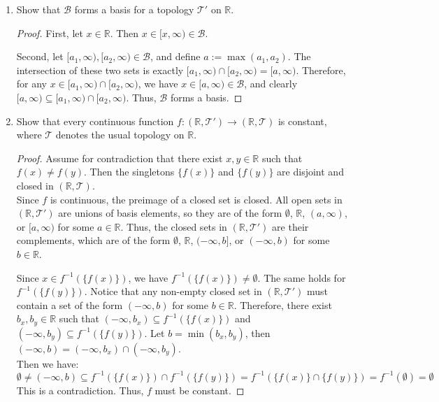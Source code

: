\documentclass[a4paper,11pt]{article}
\newcommand{\R}{\mathbb{R}}
\newcommand{\T}{\mathcal{T}}
\newcommand{\B}{\mathcal{B}}
\newcommand{\inv}[1]{#1^{-1}}
\begin{document}
\begin{enumerate}[label=\textbf{(\alph*)}]
    \item Show that $\B$ forms a basis for a topology $\T'$ on $\R$.
    \begin{proof}
        First, let $x \in \R$. Then $x \in [x,\infty) \in \B$.

        Second, let $[a_1,\infty), [a_2,\infty) \in \B$, and define $a := \max(a_1,a_2)$.
        The intersection of these two sets is exactly $[a_1,\infty) \cap [a_2,\infty) = [a,\infty)$.
        Therefore, for any $x \in [a_1,\infty) \cap [a_2,\infty)$, we have $x \in [a,\infty) \in \B$, and clearly $[a,\infty) \subseteq [a_1,\infty) \cap [a_2,\infty)$.
        Thus, $\B$ forms a basis.
    \end{proof}

\item Show that every continuous function $f\colon (\R, \T') \to (\R, \T)$ is constant, where $\T$ denotes the usual topology on $\R$.
\begin{proof}
        Assume for contradiction that there exist $x,y \in \R$ such that $f(x) \neq f(y)$.
        Then the singletons $\{f(x)\}$ and $\{f(y)\}$ are disjoint and closed in $(\R, \T)$. \\
        Since $f$ is continuous, the preimage of a closed set is closed. 
        All open sets in $(\R, \T')$ are unions of basis elements, so they are of the form $\emptyset$, $\R$, $(a,\infty)$, or $[a,\infty)$ for some $a \in \R$. 
        Thus, the closed sets in $(\R, \T')$ are their complements, which are of the form $\emptyset$, $\R$, $(-\infty,b]$, or $(-\infty,b)$ for some $b \in \R$.
        
        Since $x \in \inv{f}(\{f(x)\})$, we have $\inv{f}(\{f(x)\}) \neq \emptyset$. The same holds for $\inv{f}(\{f(y)\})$.
        Notice that any non-empty closed set in $(\R, \T')$ must contain a set of the form $(-\infty, b)$ for some $b \in \R$.
        Therefore, there exist $b_x, b_y \in \R$ such that $(-\infty, b_x) \subseteq \inv{f}(\{f(x)\})$ and $(-\infty, b_y) \subseteq \inv{f}(\{f(y)\})$.
        Let $b = \min(b_x, b_y)$, then $(-\infty, b) = (-\infty, b_x) \cap (-\infty, b_y)$. \\
        Then we have:
        \[ \emptyset \neq (-\infty, b) \subseteq \inv{f}(\{f(x)\}) \cap \inv{f}(\{f(y)\}) = \inv{f}(\{f(x)\} \cap \{f(y)\}) = \inv{f}(\emptyset) = \emptyset \]
        This is a contradiction. Thus, $f$ must be constant.
    \end{proof}
\end{enumerate}
\end{document}
